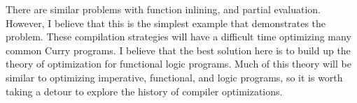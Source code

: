 There are similar problems with function inlining, and partial evaluation.
However, I believe that this is the simplest example that demonstrates the problem.
These compilation strategies will have a difficult time optimizing many common Curry programs.
I believe that the best solution here is to build up the theory of optimization for functional logic programs.
Much of this theory will be similar to optimizing imperative, functional, and logic programs,
so it is worth taking a detour to explore the history of compiler optimizations.


